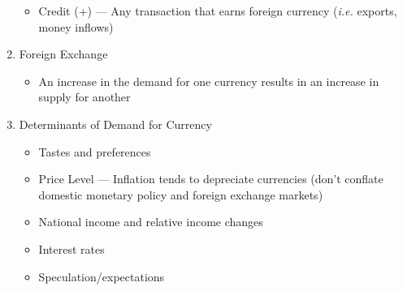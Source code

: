 \documentclass[12pt]{article}
\begin{document}
\begin{enumerate}
\begin{itemize}
      \item Credit (+) — Any transaction that earns foreign currency (\textit{i.e.} exports, money inflows)

    \end{itemize}

  \item Foreign Exchange

    \begin{itemize}

      \item An increase in the demand for one currency results in an increase in supply for another

    \end{itemize}

  \item Determinants of Demand for Currency

    \begin{itemize}

      \item Tastes and preferences

      \item Price Level — Inflation tends to depreciate currencies (don't conflate domestic monetary policy and foreign exchange markets)

      \item National income and relative income changes

      \item Interest rates

      \item Speculation/expectations

    \end{itemize}

\end{enumerate}
\end{document}

